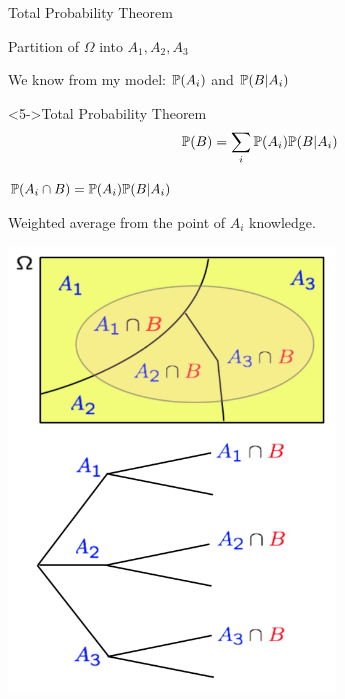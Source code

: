 \documentclass[fleqn,aspectratio=169]{beamer}
\begin{document}
\begin{frame}{Total Probability Theorem}

{
\plitemsep 0.1in
\bci 

\item<2-> Partition of $\Omega$ into $A_1,A_2,A_3$

\item<3-> We know from my model: $\mathbb{P}( A_i )$ and $\mathbb{P}( B | A_i )$ 

\item<4-> 


\begin{block}<5->{Total Probability Theorem}
$$
\mathbb{P}( B ) = \sum_{i} \mathbb{P}( A_i ) \mathbb{P}( B | A_i )
$$
\end{block}

\item<5-> $\mathbb{P}( A_i \cap B ) = \mathbb{P}( A_i ) \mathbb{P}( B | A_i )$

\item<6-> Weighted average from the point of $A_i$ knowledge. 
\eci 
}
{
\centering
\includegraphics[width=0.65\textwidth]{L2_total_ex.png}
}

\end{frame}
\end{document}
